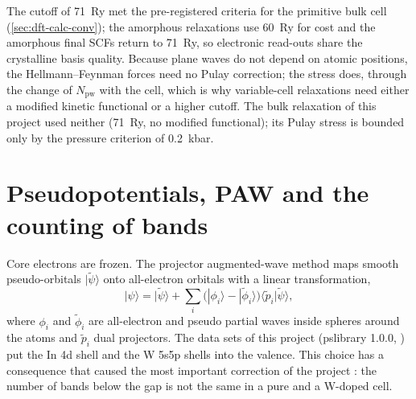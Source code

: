 The cutoff of 71~Ry met the pre-registered criteria for the primitive bulk cell (\cref{sec:dft-calc-conv}); the
amorphous relaxations use 60~Ry for cost and the amorphous final SCFs return to 71~Ry, so electronic read-outs share the
crystalline basis quality. Because plane waves do not depend on atomic positions, the Hellmann--Feynman forces need no
Pulay correction; the stress does, through the change of $N_{\mathrm{pw}}$ with the cell, which is why variable-cell
relaxations need either a modified kinetic functional or a higher cutoff. The bulk relaxation of this project used
neither (71~Ry, no modified functional); its Pulay stress is bounded only by the pressure criterion of 0.2~kbar.

\section{Pseudopotentials, PAW and the counting of bands}
\label{sec:mono-dft-paw}

Core electrons are frozen. The projector augmented-wave method \citep{Bloechl1994,Kresse1999} maps smooth
pseudo-orbitals $|\tilde\psi\rangle$ onto all-electron orbitals with a linear transformation,
\begin{equation}
|\psi\rangle = |\tilde\psi\rangle + \sum_i \big(|\phi_i\rangle - |\tilde\phi_i\rangle\big)\langle\tilde p_i|\tilde\psi\rangle ,
\label{eq:mono-dft-paw}
\end{equation}
where $\phi_i$ and $\tilde\phi_i$ are all-electron and pseudo partial waves inside spheres around the atoms and
$\tilde p_i$ dual projectors. The data sets of this project (pslibrary 1.0.0, \citealp{DalCorso2014}) put the In 4d
shell and the W 5s5p shells into the valence. This choice has a consequence that caused the most important correction
of the project : the number of bands below the gap is not the same in a pure and a W-doped cell.

